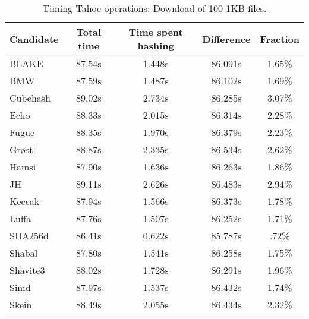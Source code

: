 \begin{table}[h]
  \centering
  \caption{Timing Tahoe operations: Download of 100 1KB files.}
  \begin{tabular}{ | l | c | c | c | c | }
    \hline
    Candidate & Total time & Time spent hashing & Difference & Fraction \\ \hline
    BLAKE     &  87.54s  &  1.448s  &  86.091s  &  1.65\%  \\  \hline
    BMW       &  87.59s  &  1.487s  &  86.102s  &  1.69\%  \\  \hline
    Cubehash  &  89.02s  &  2.734s  &  86.285s  &  3.07\%  \\  \hline
    Echo      &  88.33s  &  2.015s  &  86.314s  &  2.28\%  \\  \hline
    Fugue     &  88.35s  &  1.970s  &  86.379s  &  2.23\%  \\  \hline
    Grøstl    &  88.87s  &  2.335s  &  86.534s  &  2.62\%  \\  \hline
    Hamsi     &  87.90s  &  1.636s  &  86.263s  &  1.86\%  \\  \hline
    JH        &  89.11s  &  2.626s  &  86.483s  &  2.94\%  \\  \hline
    Keccak    &  87.94s  &  1.566s  &  86.373s  &  1.78\%  \\  \hline
    Luffa     &  87.76s  &  1.507s  &  86.252s  &  1.71\%  \\  \hline
    SHA256d   &  86.41s  &  0.622s  &  85.787s  &  .72\%   \\  \hline
    Shabal    &  87.80s  &  1.541s  &  86.258s  &  1.75\%  \\  \hline
    Shavite3  &  88.02s  &  1.728s  &  86.291s  &  1.96\%  \\  \hline
    Simd      &  87.97s  &  1.537s  &  86.432s  &  1.74\%  \\  \hline
    Skein     &  88.49s  &  2.055s  &  86.434s  &  2.32\%  \\  \hline
  \end{tabular}
  \label{tbl:hashingtimes:get1kb}
\end{table}
